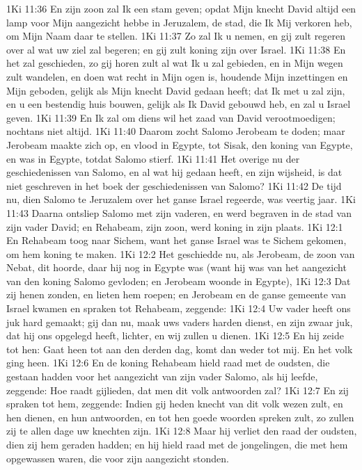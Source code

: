 1Ki 11:36  En zijn zoon zal Ik een stam geven; opdat Mijn knecht David altijd een lamp voor Mijn aangezicht hebbe in Jeruzalem, de stad, die Ik Mij verkoren heb, om Mijn Naam daar te stellen.
1Ki 11:37  Zo zal Ik u nemen, en gij zult regeren over al wat uw ziel zal begeren; en gij zult koning zijn over Israel.
1Ki 11:38  En het zal geschieden, zo gij horen zult al wat Ik u zal gebieden, en in Mijn wegen zult wandelen, en doen wat recht in Mijn ogen is, houdende Mijn inzettingen en Mijn geboden, gelijk als Mijn knecht David gedaan heeft; dat Ik met u zal zijn, en u een bestendig huis bouwen, gelijk als Ik David gebouwd heb, en zal u Israel geven.
1Ki 11:39  En Ik zal om diens wil het zaad van David verootmoedigen; nochtans niet altijd.
1Ki 11:40  Daarom zocht Salomo Jerobeam te doden; maar Jerobeam maakte zich op, en vlood in Egypte, tot Sisak, den koning van Egypte, en was in Egypte, totdat Salomo stierf.
1Ki 11:41  Het overige nu der geschiedenissen van Salomo, en al wat hij gedaan heeft, en zijn wijsheid, is dat niet geschreven in het boek der geschiedenissen van Salomo?
1Ki 11:42  De tijd nu, dien Salomo te Jeruzalem over het ganse Israel regeerde, was veertig jaar.
1Ki 11:43  Daarna ontsliep Salomo met zijn vaderen, en werd begraven in de stad van zijn vader David; en Rehabeam, zijn zoon, werd koning in zijn plaats.
1Ki 12:1  En Rehabeam toog naar Sichem, want het ganse Israel was te Sichem gekomen, om hem koning te maken.
1Ki 12:2  Het geschiedde nu, als Jerobeam, de zoon van Nebat, dit hoorde, daar hij nog in Egypte was (want hij was van het aangezicht van den koning Salomo gevloden; en Jerobeam woonde in Egypte),
1Ki 12:3  Dat zij henen zonden, en lieten hem roepen; en Jerobeam en de ganse gemeente van Israel kwamen en spraken tot Rehabeam, zeggende:
1Ki 12:4  Uw vader heeft ons juk hard gemaakt; gij dan nu, maak uws vaders harden dienst, en zijn zwaar juk, dat hij ons opgelegd heeft, lichter, en wij zullen u dienen.
1Ki 12:5  En hij zeide tot hen: Gaat heen tot aan den derden dag, komt dan weder tot mij. En het volk ging heen.
1Ki 12:6  En de koning Rehabeam hield raad met de oudsten, die gestaan hadden voor het aangezicht van zijn vader Salomo, als hij leefde, zeggende: Hoe raadt gijlieden, dat men dit volk antwoorden zal?
1Ki 12:7  En zij spraken tot hem, zeggende: Indien gij heden knecht van dit volk wezen zult, en hen dienen, en hun antwoorden, en tot hen goede woorden spreken zult, zo zullen zij te allen dage uw knechten zijn.
1Ki 12:8  Maar hij verliet den raad der oudsten, dien zij hem geraden hadden; en hij hield raad met de jongelingen, die met hem opgewassen waren, die voor zijn aangezicht stonden.

